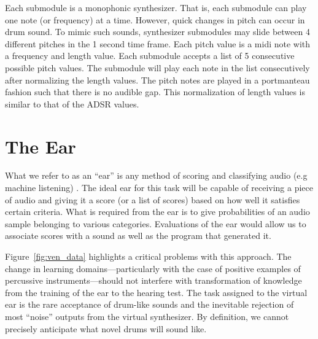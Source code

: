 \documentclass[\main/thesis.tex]{subfiles}
\begin{document}
Each submodule is a monophonic synthesizer. That is, each submodule can play one note (or frequency) at a time. However, quick changes in pitch can occur in drum sound.  To mimic such sounds, synthesizer submodules may slide between 4 different pitches in the 1 second time frame. Each pitch value is a midi note with a frequency and length value. Each submodule accepts a list of 5 consecutive possible pitch values. The submodule will play each note in the list consecutively after normalizing the length values. The pitch notes are played in a portmanteau fashion such that there is no audible gap. This normalization of length values is similar to that of the ADSR values. 


\section{The Ear}
\label{sec:ear}
What we refer to as an \enquote{ear} is any method of scoring and classifying audio (e.g machine listening) \cite{malkin2006machine,rowe1992interactive}. The ideal ear for this task will be capable of receiving a piece of audio and giving it a score (or a list of scores) based on how well it satisfies certain criteria. What is required from the ear is to give probabilities of an audio sample belonging to various categories. Evaluations of the ear would allow us to associate scores with a sound as well as the program that generated it. 

Figure~\ref{fig:ven_data} highlights a critical problems with this approach. The change in learning domains---particularly with the case of positive examples of percussive instruments---should not interfere with transformation of knowledge from the training of the ear to the hearing test. The task assigned to the virtual ear is the rare acceptance of drum-like sounds and the inevitable rejection of most \enquote{noise} outputs from the virtual synthesizer. By definition, we cannot precisely anticipate what novel drums will sound like. 


\end{document}

